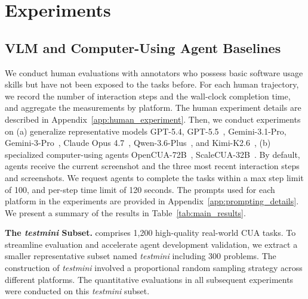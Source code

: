 \section{Experiments}



\subsection{VLM and Computer-Using Agent Baselines}
We conduct human evaluations with annotators who possess basic software usage skills but have not been exposed to the tasks before. For each human trajectory, we record the number of interaction steps and the wall-clock completion time, and aggregate the measurements by platform. The human experiment details are described in Appendix~\ref{app:human_experiment}.
Then, we conduct experiments on (a) generalize representative models GPT-5.4, GPT-5.5~\citep{openai2026gpt54, openai2026gpt55}, Gemini-3.1-Pro, Gemini-3-Pro~\citep{googledeepmind2026gemini31pro,googledeepmind2025gemini3pro}, Claude Opus 4.7~\citep{anthropic2026opus47}, Qwen-3.6-Plus~\citep{alibabacloud2026qwen36plus}, and Kimi-K2.6~\citep{moonshot2026kimi26}, (b) specialized computer-using agents OpenCUA-72B~\citep{wang2025opencua}, ScaleCUA-32B~\citep{liu2025scalecua}. By default, agents receive the current screenshot and the three most recent interaction steps and screenshots. We request agents to complete the tasks within a max step limit of 100, and per-step time limit of 120 seconds. The prompts used for each platform in the experiments are provided in Appendix~\ref{app:prompting_details}. We present a summary of the results in Table~\ref{tab:main_results}.


\noindent
\textbf{The \textit{testmini} Subset.} \dataset comprises 1,200 high-quality real-world CUA tasks. To streamline evaluation and accelerate agent development validation, we extract a smaller representative subset named \textit{testmini} including 300 problems. The construction of \textit{testmini} involved a proportional random sampling strategy across different platforms. The quantitative evaluations in all subsequent experiments were conducted on this \textit{testmini} subset.





